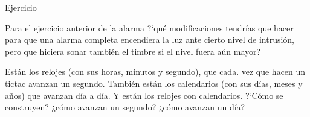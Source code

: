 \documentclass[10pt,envcountsect,spanish]{beamer}
\begin{document}
\begin{frame}{Ejercicio} \small 
\begin{ejercicio}{}
Para el ejercicio anterior de la alarma ?`qué modificaciones tendrías que hacer para que una alarma completa encendiera la luz ante cierto nivel de intrusión, pero que hiciera sonar también el timbre si el nivel fuera aún mayor?
\end{ejercicio}



\begin{ejercicio}{}
Están los relojes (con sus horas, minutos y segundo), que cada. vez que hacen un tictac avanzan un segundo. También están los calendarios (con sus días, meses y años) que avanzan día a día. Y están los relojes con calendarios. ?`Cómo se construyen? ¿cómo avanzan un segundo? ¿cómo avanzan un día?
\end{ejercicio}




%
%
%
%
%





\end{frame}
\end{document}
